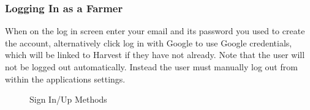 \documentclass[11pt]{article}
\begin{document}
\subsubsection{Logging In as a Farmer}
When on the log in screen enter your email and its password you used to create the account, alternatively click log in with Google to use Google credentials, which will be linked to Harvest if they have not already. Note that the user will not be logged out automatically. Instead the user must manually log out from within the applications settings.
\begin{figure}
 \centering
 \qquad
 \qquad
 \qquad
 \caption{Sign In/Up Methods}
 \label{LogInMobile}
\end{figure}
\end{document}
